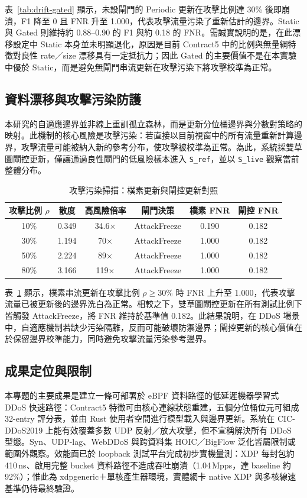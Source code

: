 \documentclass[12pt, a4paper, fontset=none]{ctexart}
\newcommand{\code}[1]{\texttt{#1}}
\begin{document}
表~\ref{tab:drift-gated} 顯示，未設閘門的 Periodic 更新在攻擊比例達 30\% 後即崩潰，F1 降至 0 且 FNR 升至 1.000，代表攻擊流量污染了重新估計的邊界。Static 與 Gated 則維持約 0.88--0.90 的 F1 與約 0.18 的 FNR。需誠實說明的是，在此漂移設定中 Static 本身並未明顯退化，原因是目前 Contract5 中的比例與無量綱特徵對良性 rate／size 漂移具有一定抵抗力；因此 Gated 的主要價值不是在本實驗中優於 Static，而是避免無閘門串流更新在攻擊污染下將攻擊校準為正常。

\subsection{資料漂移與攻擊污染防護}
本研究的自適應邊界並非線上重訓孤立森林，而是更新分位桶邊界與分數對策略的映射。此機制的核心風險是攻擊污染：若直接以目前視窗中的所有流量重新計算邊界，攻擊流量可能被納入新的參考分布，使攻擊被校準為正常。為此，系統採雙草圖閘控更新，僅讓通過良性閘門的低風險樣本進入 \code{S\_ref}，並以 \code{S\_live} 觀察當前整體分布。

\begin{table}[H]
  \centering
  \caption{攻擊污染掃描：樸素更新與閘控更新對照}
  \label{tab:contamination}
  \renewcommand{\arraystretch}{1.2}
  \begin{tabular}{c c c c c c}
    \toprule
    \textbf{攻擊比例 $\rho$} & 散度 & 高風險倍率 & 閘門決策 & 樸素 FNR & 閘控 FNR \\
    \midrule
    10\% & 0.349 & 34.6$\times$ & AttackFreeze & 0.190 & 0.182 \\
    30\% & 1.194 & 70$\times$ & AttackFreeze & 1.000 & 0.182 \\
    50\% & 2.224 & 89$\times$ & AttackFreeze & 1.000 & 0.182 \\
    80\% & 3.166 & 119$\times$ & AttackFreeze & 1.000 & 0.182 \\
    \bottomrule
  \end{tabular}
\end{table}

表~\ref{tab:contamination} 顯示，樸素串流更新在攻擊比例 $\rho \geq 30\%$ 時 FNR 上升至 1.000，代表攻擊流量已被更新後的邊界洗白為正常。相較之下，雙草圖閘控更新在所有測試比例下皆觸發 AttackFreeze，將 FNR 維持於基準值 0.182。此結果說明，在 DDoS 場景中，自適應機制若缺少污染隔離，反而可能破壞防禦邊界；閘控更新的核心價值在於保留邊界校準能力，同時避免攻擊流量污染參考邊界。

\subsection{成果定位與限制}
本專題的主要成果是建立一條可部署於 eBPF 資料路徑的低延遲機器學習式 DDoS 快速路徑：Contract5 特徵可由核心連線狀態重建，五個分位桶位元可組成 32-entry 評分表，並由 Rust 使用者空間進行模型載入與邊界更新。系統在 CIC-DDoS2019 上能有效覆蓋多數 UDP 反射／放大攻擊，但不宣稱解決所有 DDoS 型態。Syn、UDP-lag、WebDDoS 與跨資料集 HOIC／BigFlow 泛化皆屬限制或範圍外觀察。效能面已於 loopback 測試平台完成初步實機量測：XDP 每封包約 410\,ns、啟用完整 bucket 資料路徑不造成吞吐崩潰（1.04\,Mpps，達 baseline 約 92\%）；惟此為 xdpgeneric＋單核產生器環境，實體網卡 native XDP 與多核線速基準仍待最終驗證。
\end{document}
